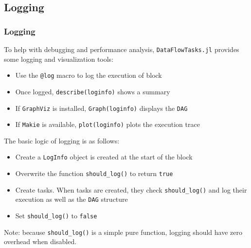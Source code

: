 \documentclass{beamer}
\newcommand{\DFT}{\texttt{DataFlowTasks.jl}}
\begin{document}
\subsection{Logging}

\begin{frame}
\frametitle{Logging}

To help with debugging and performance analysis, \DFT{} provides some logging
and visualization tools:
\begin{itemize}
  \item Use the \texttt{@log} macro to log the execution of block
  \item Once logged, \texttt{describe(loginfo)} shows a summary
  \item If \texttt{GraphViz} is installed,
  \texttt{Graph(loginfo)} displays the \texttt{DAG}
  \item If \texttt{Makie} is available,
  \texttt{plot(loginfo)} plots the execution trace
\end{itemize}

The basic logic of logging is as follows:
\begin{itemize}
  \item Create a \texttt{LogInfo} object is created at the start of the block  
  \item Overwrite the function
  \texttt{should_log()} to return \texttt{true}
  \item Create tasks. When tasks are created, they check
  \texttt{should_log()} and log their execution as well as the
  \texttt{DAG} structure
  \item Set \texttt{should_log()} to \texttt{false}
\end{itemize}

\begin{alertblock}{}
  Note: because \texttt{should_log()} is a simple pure function,
  logging should have zero overhead when disabled.
\end{alertblock}

\end{frame}
\end{document}
